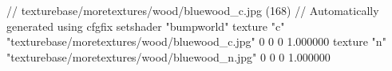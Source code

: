 // texturebase/moretextures/wood/bluewood_c.jpg (168)
// Automatically generated using cfgfix
setshader "bumpworld"
texture "c" "texturebase/moretextures/wood/bluewood_c.jpg" 0 0 0 1.000000
texture "n" "texturebase/moretextures/wood/bluewood_n.jpg" 0 0 0 1.000000
